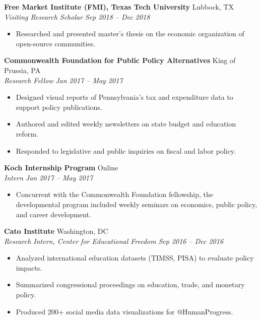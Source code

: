 \documentclass[a4paper,11pt]{article}
\begin{document}
\vspace{1mm}
\textbf{Free Market Institute (FMI), Texas Tech University} \hfill Lubbock, TX\\
\textit{Visiting Research Scholar} \hfill  \textit{Sep 2018 -- Dec 2018}
\begin{itemize}
\item Researched and presented master’s thesis on the economic organization of open-source communities.
\end{itemize}

\vspace{1mm}
\textbf{Commonwealth Foundation for Public Policy Alternatives} \hfill King of Prussia, PA\\
\textit{Research Fellow} \hfill  \textit{Jan 2017 -- May 2017}
\begin{itemize}
\item Designed visual reports of Pennsylvania’s tax and expenditure data to support policy publications.
\item Authored and edited weekly newsletters on state budget and education reform.
\item Responded to legislative and public inquiries on fiscal and labor policy.
\end{itemize}

\vspace{1mm}
\textbf{Koch Internship Program} \hfill Online\\
\textit{Intern} \hfill  \textit{Jan 2017 -- May 2017}
\begin{itemize}
\item Concurrent with the Commonwealth Foundation fellowship, the developmental program included weekly seminars on economics, public policy, and career development.
\end{itemize}

\vspace{1mm}
\textbf{Cato Institute} \hfill Washington, DC\\
\textit{Research Intern, Center for Educational Freedom} \hfill \textit{Sep 2016 -- Dec 2016}
\begin{itemize}
\item Analyzed international education datasets (TIMSS, PISA) to evaluate policy impacts.
\item Summarized congressional proceedings on education, trade, and monetary policy.
\item Produced 200+ social media data visualizations for @HumanProgress.
\end{itemize}
\end{document}
